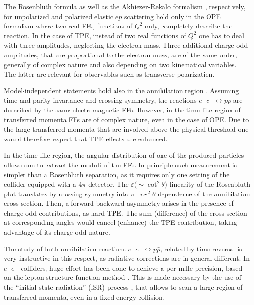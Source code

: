 The Rosenbluth formula \cite{Rosenbluth:1950yq} as well as the Akhiezer-Rekalo  formalism \cite{Akhiezer:1968ek,Akhiezer:1974em}, respectively, for  unpolarized and polarized elastic $ep$ scattering hold only in the OPE formalism where two real FFs, functions of $Q^2$ only, completely describe the reaction. In the case of TPE, instead of two real functions of $Q^2$ one has to deal with three amplitudes, neglecting the electron mass. Three additional charge-odd amplitudes, that are proportional to the electron mass, are of the same order, generally of complex nature and also depending on two kinematical variables. The latter are relevant for observables such as transverse polarization.



Model-independent statements hold also in the annihilation region \cite{Gakh:2005hh,Gakh:2005wa}. Assuming time and parity invariance and crossing symmetry, the reactions $e^+e^-\leftrightarrow p\bar p$ are described by the same electromagnetic FFs. However, in the time-like region of transferred momenta FFs are of complex nature, even in the case of OPE.  Due to the large transferred momenta that are involved above the physical threshold one would therefore expect that TPE effects are enhanced. 

In the time-like region, the angular distribution of one of the produced particles allows one to extract the moduli of the FFs. In principle such measurement is simpler than a Rosenbluth separation, as it requires only one setting of the collider equipped with  a $4\pi$ detector. The $\varepsilon(\sim \cot^2\theta$)-linearity of the Rosenbluth plot translates by crossing symmetry into a $\cos^2\theta$ dependence of the annihilation cross section. Then, a forward-backward asymmetry arises in the presence of charge-odd contributions, as hard TPE. The sum (difference) of the cross section at corresponding angles would cancel (enhance) the TPE contribution, taking advantage of its charge-odd nature. 


The study of both annihilation reactions $e^+e^-\leftrightarrow p\bar p$, related by time reversal is very instructive in this respect, as radiative corrections are in general different. In $e^+e^-$  colliders, huge effort has been done to achieve a per-mille precision, based on the lepton structure function method \cite{Baier:1980kx}. This is made necessary by the use of the ``initial state radiation'' (ISR) process \cite{Czyz:2004ua}, that allows to scan a large region of transferred momenta, even in a fixed energy collision. 

